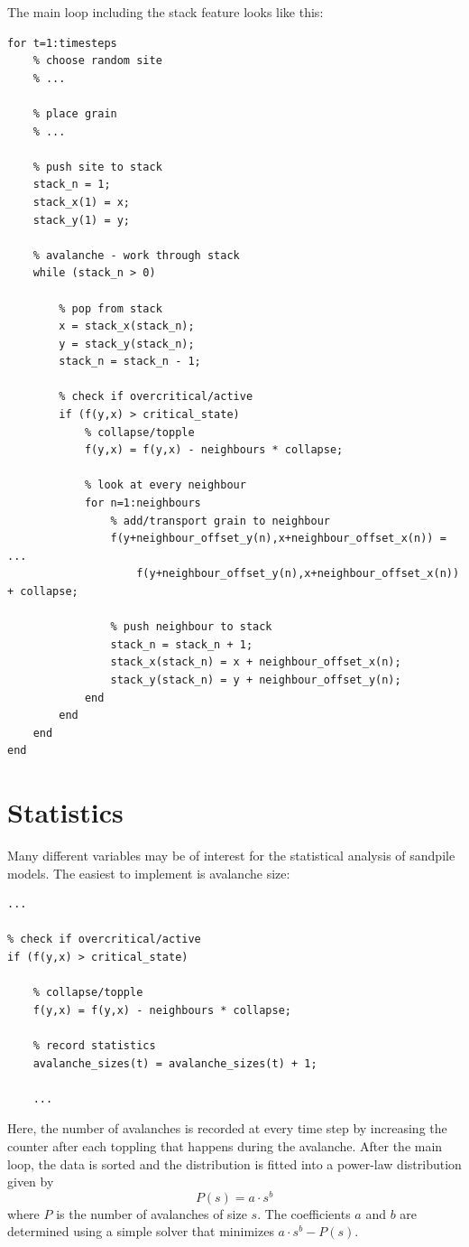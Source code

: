 The main loop including the stack feature looks like this:
\begin{lstlisting}
for t=1:timesteps
	% choose random site
	% ...

	% place grain
	% ...

	% push site to stack
	stack_n = 1;
	stack_x(1) = x;
	stack_y(1) = y;

	% avalanche - work through stack
	while (stack_n > 0)

		% pop from stack
		x = stack_x(stack_n);
		y = stack_y(stack_n);
		stack_n = stack_n - 1;

		% check if overcritical/active
		if (f(y,x) > critical_state)
			% collapse/topple
			f(y,x) = f(y,x) - neighbours * collapse;

			% look at every neighbour
			for n=1:neighbours
				% add/transport grain to neighbour
				f(y+neighbour_offset_y(n),x+neighbour_offset_x(n)) = ...
					f(y+neighbour_offset_y(n),x+neighbour_offset_x(n)) + collapse;

				% push neighbour to stack
				stack_n = stack_n + 1;
				stack_x(stack_n) = x + neighbour_offset_x(n);
				stack_y(stack_n) = y + neighbour_offset_y(n);
			end
		end
	end
end
\end{lstlisting}


\section{Statistics}\label{chp3:statistics}
Many different variables may be of interest for the statistical analysis of sandpile models. The easiest to implement is avalanche size:

\begin{lstlisting}
...

% check if overcritical/active
if (f(y,x) > critical_state)

	% collapse/topple
	f(y,x) = f(y,x) - neighbours * collapse;

	% record statistics
	avalanche_sizes(t) = avalanche_sizes(t) + 1;

	...
\end{lstlisting}

Here, the number of avalanches is recorded at every time step by increasing the counter after each toppling that happens during the avalanche. After the main loop, the data is sorted and the distribution is fitted into a power-law distribution given by
\[
P(s) = a \cdot s^b
\]
where $P$ is the number of avalanches of size $s$. The coefficients $a$ and $b$ are determined using a simple solver that minimizes $a \cdot s^b-P(s)$.

